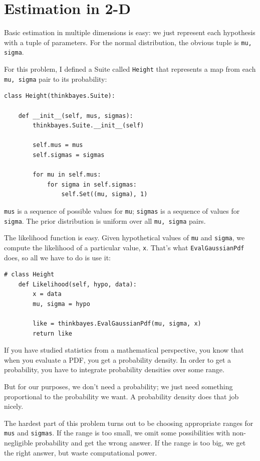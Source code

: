 \documentclass[12pt]{book}
\begin{document}
\section{Estimation in 2-D}

Basic estimation in multiple dimensions is easy: we just represent
each hypothesis with a tuple of parameters.  For the normal
distribution, the obvious tuple is {\tt mu, sigma}.

For this problem, I defined a Suite called {\tt Height} that represents
a map from each {\tt mu, sigma} pair to its probability:

\begin{verbatim}
class Height(thinkbayes.Suite):

    def __init__(self, mus, sigmas):
        thinkbayes.Suite.__init__(self)

        self.mus = mus
        self.sigmas = sigmas

        for mu in self.mus:
            for sigma in self.sigmas:
                self.Set((mu, sigma), 1)
\end{verbatim}

{\tt mus} is a sequence of possible values for {\tt mu}; {\tt sigmas}
is a sequence of values for {\tt sigma}.  The prior distribution
is uniform over all {\tt mu, sigma} pairs.

The likelihood function is easy.  Given hypothetical values
of {\tt mu} and {\tt sigma}, we compute the likelihood
of a particular value, {\tt x}.  That's what {\tt EvalGaussianPdf}
does, so all we have to do is use it:

\begin{verbatim}
# class Height
    def Likelihood(self, hypo, data):
        x = data
        mu, sigma = hypo

        like = thinkbayes.EvalGaussianPdf(mu, sigma, x)
        return like
\end{verbatim}

If you have studied statistics from a mathematical perspective,
you know that when you evaluate a PDF, you get a probability
density.  In order to get a probability, you have to integrate
probability densities over some range.

But for our purposes, we don't need a probability; we just
need something proportional to the probability we want.
A probability density does that job nicely.

The hardest part of this problem turns
out to be choosing appropriate ranges for {\tt mus} and
{\tt sigmas}.  If the range is too small, we omit some
possibilities with non-negligible probability and get the
wrong answer.  If the range is too big, we get the right answer,
but waste computational power.
\end{document}
